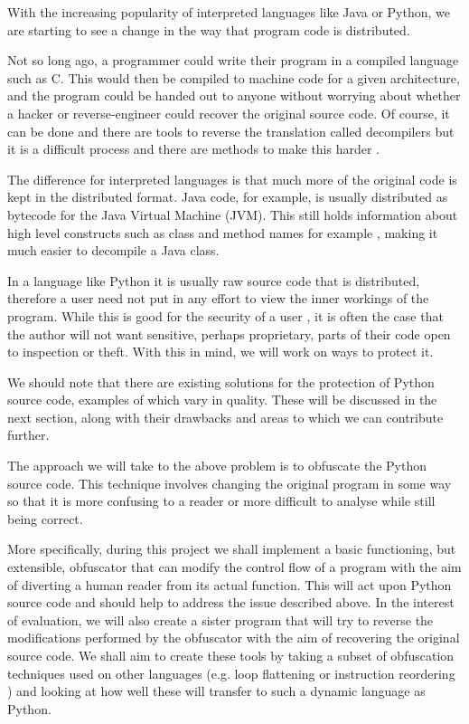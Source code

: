 \documentclass{report}
\begin{document}
With the increasing popularity of interpreted languages like Java or Python, we are starting
to see a change in the way that program code is distributed.

Not so long ago, a programmer could write their program in a compiled language such as C. This would then be compiled
to machine code for a given architecture, and the program could be handed out to anyone without
worrying about whether a hacker or reverse-engineer could recover the original source code.
Of course, it can be done and there are tools to reverse the translation called decompilers\cite{cdecomp} but it
is a difficult process and there are methods to make this harder \cite{disres}.

The difference for interpreted languages is that much more of the original code is kept in the
distributed format. Java code, for example, is usually distributed as bytecode for the Java Virtual
Machine (JVM). This still holds information about high level constructs such as class and method names for example \cite{classinfo},
making it much easier to decompile a Java class.

In a language like Python it is usually raw source code that is distributed, therefore a
user need not put in any effort to view the inner workings of the program. While this is good
for the security of a user \cite{noobf}, it is often the case that the author will not want sensitive,
perhaps proprietary, parts of their code open to inspection or theft. With this in mind, we will work on ways to protect it.

We should note that there are existing solutions for the protection of Python source code, examples of which vary in quality.
These will be discussed in the next section, along with their drawbacks and areas to which we can contribute further.

The approach we will take to the above problem is to obfuscate the Python source code. This technique involves changing the
original program in some way so that it is more confusing to a reader or more difficult to analyse while still being correct.

More specifically, during this project we shall implement a basic functioning, but extensible, obfuscator
that can modify the control flow of a program with the aim of diverting a human reader from its actual
function. This will act upon Python source code and should help to address the issue described above.
In the interest of evaluation, we will also create a sister program that will try to reverse the modifications performed by the
obfuscator with the aim of recovering the original source code. 
We shall aim to create these tools by taking a subset of obfuscation techniques used on other languages (e.g.
loop flattening or instruction reordering \cite{taxobftrans}) and looking at how well these will transfer to such a dynamic language as Python.
\end{document}
